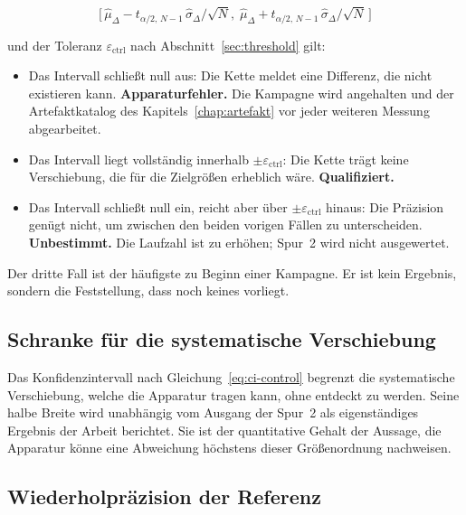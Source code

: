 \documentclass[12pt,a4paper]{report}
\begin{document}
\begin{equation}
  \bigl[\,\hat{\mu}_{\Delta} - t_{\alpha/2,\,N-1}\,\hat{\sigma}_{\Delta}/\sqrt{N},\;
        \hat{\mu}_{\Delta} + t_{\alpha/2,\,N-1}\,\hat{\sigma}_{\Delta}/\sqrt{N}\,\bigr]
  \label{eq:ci-control}
\end{equation}

und der Toleranz $\varepsilon_{\mathrm{ctrl}}$ nach
Abschnitt~\ref{sec:threshold} gilt:

\begin{itemize}
  \item Das Intervall schließt null aus: Die Kette meldet eine
        Differenz, die nicht existieren kann. \textbf{Apparaturfehler.}
        Die Kampagne wird angehalten und der Artefaktkatalog des
        Kapitels~\ref{chap:artefakt} vor jeder weiteren Messung
        abgearbeitet.
  \item Das Intervall liegt vollständig innerhalb
        $\pm\varepsilon_{\mathrm{ctrl}}$: Die Kette trägt keine
        Verschiebung, die für die Zielgrößen erheblich wäre.
        \textbf{Qualifiziert.}
  \item Das Intervall schließt null ein, reicht aber über
        $\pm\varepsilon_{\mathrm{ctrl}}$ hinaus: Die Präzision genügt
        nicht, um zwischen den beiden vorigen Fällen zu unterscheiden.
        \textbf{Unbestimmt.} Die Laufzahl ist zu erhöhen; Spur~2 wird
        nicht ausgewertet.
\end{itemize}

Der dritte Fall ist der häufigste zu Beginn einer Kampagne. Er ist kein
Ergebnis, sondern die Feststellung, dass noch keines vorliegt.

\subsection{Schranke für die systematische Verschiebung}

Das Konfidenzintervall nach Gleichung~\eqref{eq:ci-control}
begrenzt die systematische Verschiebung, welche die Apparatur tragen
kann, ohne entdeckt zu werden. Seine halbe Breite wird unabhängig vom
Ausgang der Spur~2 als eigenständiges Ergebnis der Arbeit berichtet. Sie
ist der quantitative Gehalt der Aussage, die Apparatur könne eine
Abweichung höchstens dieser Größenordnung nachweisen.

\subsection{Wiederholpräzision der Referenz}
\end{document}

